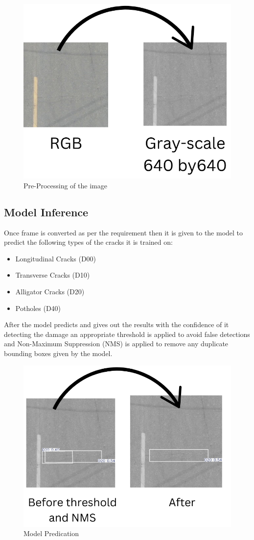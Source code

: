 \begin{figure}[H]
    \centering
    \includegraphics[width=0.5\linewidth]{figures/RGB.png}
    \caption{Pre-Processing of the image}
    \label{fig:RGB-label}
\end{figure}

\subsection{Model Inference}
Once frame is converted as per the requirement then it is given to the model to predict the following types of the cracks it is trained on:
\begin{itemize}
    \item Longitudinal Cracks (D00)
    \item Transverse Cracks (D10)
    \item Alligator Cracks (D20)
    \item Potholes (D40)
\end{itemize}

After the model predicts and gives out the results with the confidence of it detecting the damage an appropriate threshold is applied to avoid false detections and Non-Maximum Suppression (NMS) is applied to remove any duplicate bounding boxes given by the model.

\begin{figure}[H]
    \centering
    \includegraphics[width=0.5\linewidth]{figures/RGB (1).png}
    \caption{Model Predication}
    \label{fig:1020-label}
\end{figure}


